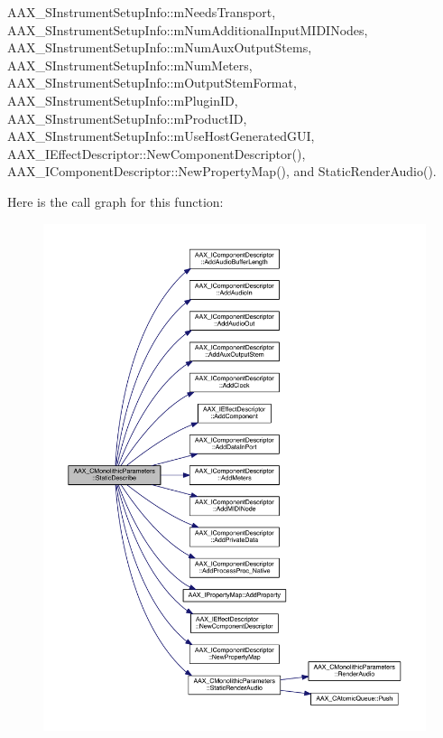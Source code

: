 A\+A\+X\+\_\+\+S\+Instrument\+Setup\+Info\+::m\+Needs\+Transport, A\+A\+X\+\_\+\+S\+Instrument\+Setup\+Info\+::m\+Num\+Additional\+Input\+M\+I\+D\+I\+Nodes, A\+A\+X\+\_\+\+S\+Instrument\+Setup\+Info\+::m\+Num\+Aux\+Output\+Stems, A\+A\+X\+\_\+\+S\+Instrument\+Setup\+Info\+::m\+Num\+Meters, A\+A\+X\+\_\+\+S\+Instrument\+Setup\+Info\+::m\+Output\+Stem\+Format, A\+A\+X\+\_\+\+S\+Instrument\+Setup\+Info\+::m\+Plugin\+I\+D, A\+A\+X\+\_\+\+S\+Instrument\+Setup\+Info\+::m\+Product\+I\+D, A\+A\+X\+\_\+\+S\+Instrument\+Setup\+Info\+::m\+Use\+Host\+Generated\+G\+U\+I, A\+A\+X\+\_\+\+I\+Effect\+Descriptor\+::\+New\+Component\+Descriptor(), A\+A\+X\+\_\+\+I\+Component\+Descriptor\+::\+New\+Property\+Map(), and Static\+Render\+Audio().



Here is the call graph for this function\+:
\nopagebreak
\begin{figure}[H]
\begin{center}
\leavevmode
\includegraphics[width=350pt]{a00026_a69f9b80a70ecc6b7b2a7eec372d2502a_cgraph}
\end{center}
\end{figure}


